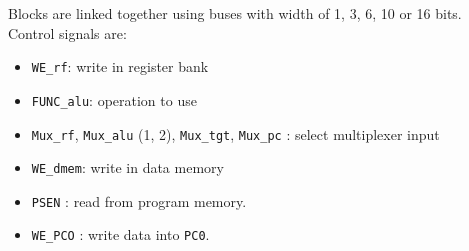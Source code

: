 \documentclass[10pt,a4paper]{article}
\theoremstyle{definition}%
\begin{document}
Blocks are linked together using buses with width of 1, 3, 6, 10 or 16 bits. Control signals are:
\begin{itemize}
\item \verb!WE_rf!: write in register bank
\item \verb!FUNC_alu!: operation to use
\item \verb!Mux_rf!, \verb!Mux_alu! (1, 2), \verb!Mux_tgt!, \verb!Mux_pc! : select multiplexer input
\item \verb!WE_dmem!: write in data memory
\item \verb!PSEN! : read from program memory.
\item \verb!WE_PCO! : write data into \verb!PC0!.
\end{itemize}


\end{document}
